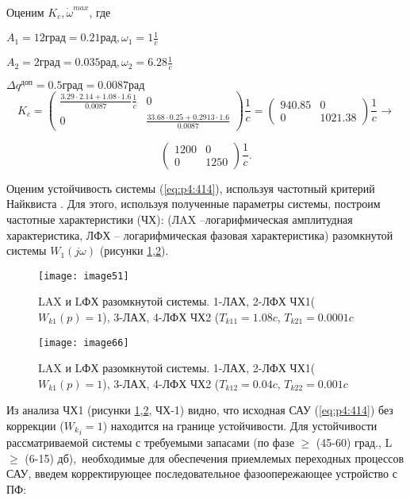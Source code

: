 Оценим  \( K_{c}, \dot \omega ^{max} \), где 

$A_1 = 12 \textit{град} = 0.21 \textit{рад}, \omega_1 = 1 \frac{1}{c}$

$A_2 = 2 \textit{град} = 0.035 \textit{рад}, \omega_2 = 6.28 \frac{1}{c}$

$\varDelta q^{\textit{доп}} =  0.5 \textit{град} = 0.0087 \textit{рад}$
\[ 
K_{c}=
\left( \begin{array}{cc}
\frac{3.29 \cdot 2.14 + 1.08 \cdot 1.6}{0.0087} \frac{1}{c}&0 \\
0& \frac{33.68 \cdot 0.25 + 0.2913 \cdot 1.6}{0.0087}
\end{array}\right)\frac{1}{c}=
\left( \begin{array}{cc}
940.85 &0 \\
0& 1021.38
\end{array}\right) \frac{1}{c} \rightarrow
\]

\[
\left( \begin{array}{cc}
1200 &0 \\
0& 1250
\end{array}\right)\frac{1}{c}
. 
\] \par

Оценим устойчивость системы (\ref{eq:p4:414}), используя частотный критерий Найквиста \cite[]{Bessekerski}. Для этого, используя полученные параметры системы, построим частотные характеристики (ЧХ): (ЛAX –логарифмическая амплитудная характеристика, ЛФХ – логарифмическая фазовая характеристика) разомкнутой системы $W_1(j \omega)$ (рисунки \ref{fig:LogAmpChar1},\ref{fig:LogAmpChar2}).\par


\begin{figure}[ht]
	\centering
	\texttt{[image: image51]} 
	\caption{LAX и LФХ разомкнутой системы. 1-ЛАХ, 2-ЛФХ ЧХ1($W_{k1}(p)=1 $), 3-ЛАХ, 4-ЛФХ ЧХ2 ($T_{k11} = 1.08 c$, $T_{k21} = 0.0001 c$}
	\label{fig:LogAmpChar1}
\end{figure}

\begin{figure}[ht]
	\centering
	\texttt{[image: image66]} 
	\caption{LAX и LФХ разомкнутой системы. 1-ЛАХ, 2-ЛФХ ЧХ1($W_{k1}(p)=1 $), 3-ЛАХ, 4-ЛФХ ЧХ2 ($T_{k12} = 0.04 c$, $T_{k22} = 0.001 c$}
	\label{fig:LogAmpChar2}
\end{figure}

Из анализа ЧХ1 (рисунки \ref{fig:LogAmpChar1},\ref{fig:LogAmpChar2}, ЧХ-1) видно, что исходная САУ (\ref{eq:p4:414}) без коррекции (${W_k}_i=1$) находится на границе устойчивости. Для устойчивости рассматриваемой системы с требуемыми запасами (по фазе  $ \geq $  (45-60) град., L~$\geq$ (6-15) дб),\ необходимые для обеспечения приемлемых переходных процессов САУ, введем корректирующее последовательное фазоопережающее устройство с ПФ:

